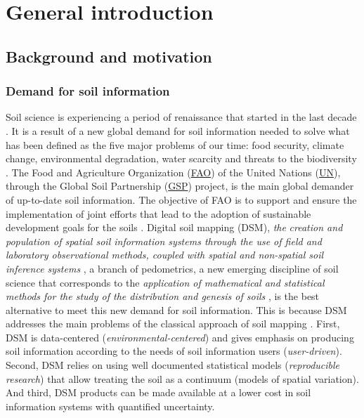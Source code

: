 \setcounter{page}{1}
\artigofalse
\chapter{General introduction}
\label{chap:introduction}


\section{Background and motivation}

\subsection{Demand for soil information}

Soil science is experiencing a period of renaissance that started in the last 
decade \cite{HarteminkEtAl2008}. It is a result of a new global demand for soil 
information needed to solve what has been defined as the five major problems of
our time: food security, climate change, environmental degradation, water 
scarcity and threats to the biodiversity \cite{SanchezEtAl2009}. The Food and 
Agriculture Organization (\href{http://www.fao.org/index_en.htm}{FAO}) of the 
United Nations (\href{http://www.un.org/en/}{UN}), through the Global Soil 
Partnership (\href{http://www.fao.org/globalsoilpartnership/en/}{GSP}) project, 
is the main global demander of up-to-date soil information. The objective of 
FAO is to support and ensure the implementation of joint efforts that lead to 
the adoption of sustainable development goals for the soils \cite{FAO2012}. 
Digital soil mapping (DSM), \textit{the} \textit{creation and population of 
spatial soil information systems through the use of field and laboratory 
observational methods, coupled with spatial and non-spatial soil inference 
systems} \cite{LagacherieEtAl2007a}, a branch of pedometrics, a new emerging 
discipline of soil science that corresponds to the \textit{application of 
mathematical and statistical methods for the study of the distribution and 
genesis of soils} \cite{Heuvelink2003}, is the best alternative to meet this 
new demand for soil information. This is because DSM addresses the main 
problems of the classical approach of soil mapping \cite{Kempen2011}. First, 
DSM is data-centered (\textit{environmental-centered}) and gives emphasis on 
producing soil information according to the needs of soil information users 
(\textit{user-driven}). Second, DSM relies on using well documented statistical
models (\textit{reproducible research}) that allow treating the soil as a 
continuum (models of spatial variation). And third, DSM products can be made 
available at a lower cost in soil information systems with quantified 
uncertainty.


